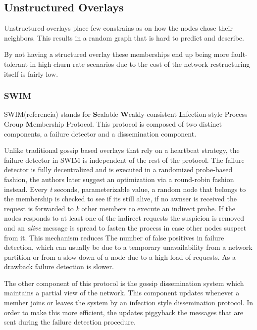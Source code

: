 \subsection{Unstructured Overlays}
\label{sub:unstructured_overlays}

Unstructured overlays place few constrains as on how the nodes chose their
neighbors. This results in a random graph that is hard to predict and describe.

By not having a structured overlay these memberships end up being more fault-tolerant
in high churn rate scenarios due to the cost of the network restructuring
itself is fairly low.

\subsubsection{SWIM}
\label{subsec:swim}

SWIM(referencia) stands for \textbf{S}calable \textbf{W}eakly-consistent \textbf{I}nfection-style
Process Group \textbf{M}embership Protocol. This protocol is composed of two distinct
components, a failure detector and a dissemination component.

Unlike traditional gossip based overlays that rely on a heartbeat strategy,
the failure detector in SWIM is independent of the rest of the protocol.
The failure detector is fully decentralized and is executed in a randomized
probe-based fashion, the authors later suggest an optimization via a round-robin
fashion instead. Every \textit{t} seconds, parameterizable value, a random
node that belongs to the membership is checked to see if its still alive, if
no awnser is received the request is forwarded to \textit{k} other members to
execute an indirect probe. If the nodes responds to at least one of the indirect
requests the suspicion is removed and an \textit{alive} message is spread to
fasten the process in case other nodes suspect from it.  This mechanism reduces The
number of false positives in failure detection, which can usually be due to a
temporary unavailability from a network partition or from a slow-down of a node
due to a high load of requests. As a drawback failure detection is slower.

The other component of this protocol is the gossip dissemination system which
maintains a partial view of the network. This component updates whenever a member
joins or leaves the system by an infection style dissemination protocol. In order to
make this more efficient, the updates piggyback the messages that are sent during the
failure detection procedure.

